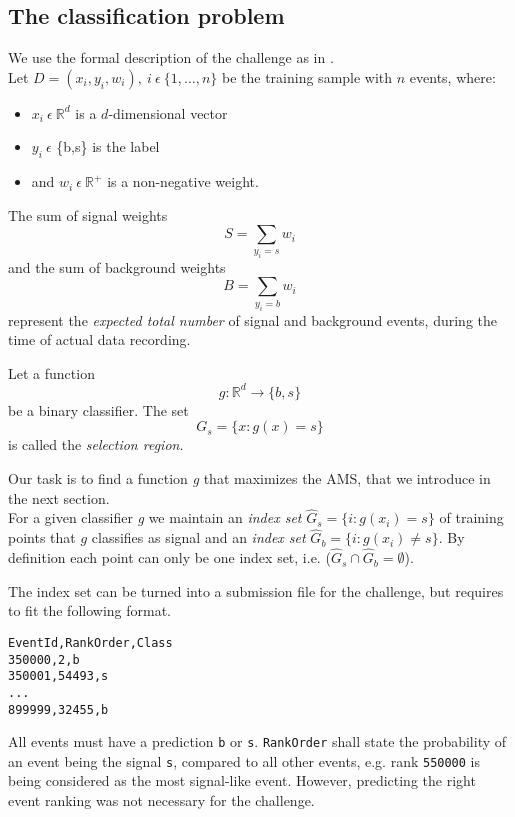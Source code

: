 \subsection{The classification problem}\label{sec:prob}
We use the formal description of the challenge as in \cite{higgsPaper}.\\
Let $D = {(x_i,y_i,w_i)}, \ i \ \epsilon \ \{1,\ldots,n\}$ be the training sample with $n$ events, where:

\begin{itemize}
	\item $x_i \ \epsilon \ \mathbb{R}^{d}$ is a $d$-dimensional vector
	\item $y_i \ \epsilon$ \{b,s\} is the label
	\item and $w_i \ \epsilon \ \mathbb{R}^{+}$ is a non-negative weight.
\end{itemize}

The sum of signal weights
$$S = \sum_{y_i = s} w_i$$
and the sum of background weights
$$B = \sum_{y_i = b} w_i$$
represent the \emph{expected total number} of signal and background events, during the time of actual data recording.

Let a function $$g: \mathbb{R}^{d} \rightarrow \{b,s\}$$
be a binary classifier.
The set $$G_s = \{x : g(x) = s \}$$ is called the \emph{selection region}.

Our task is to find a function \emph{g} that maximizes the AMS, that we introduce in the next section.\\
For a given classifier \emph{g} we maintain an \emph{index set} 
$ \hat{G}_s = \{i : g(x_i) = s \} $ of training points that $g$ classifies as signal and an \emph{index set} $ \hat{G}_b = \{i : g(x_i) \neq s \} $. By definition each point can only be one index set, i.e. ($\hat{G}_s \cap \hat{G}_b = \emptyset$).

The index set can be turned into a submission file for the challenge, but requires to fit the following format.

\begin{verbatim}
EventId,RankOrder,Class
350000,2,b
350001,54493,s
...
899999,32455,b
\end{verbatim}

All events must have a prediction \texttt{b} or \texttt{s}. \texttt{RankOrder} shall state the probability of an event being the signal \texttt{s}, compared to all other events, e.g. rank \texttt{550000} is being considered as the most signal-like event. However, predicting the right event ranking was not necessary for the challenge.